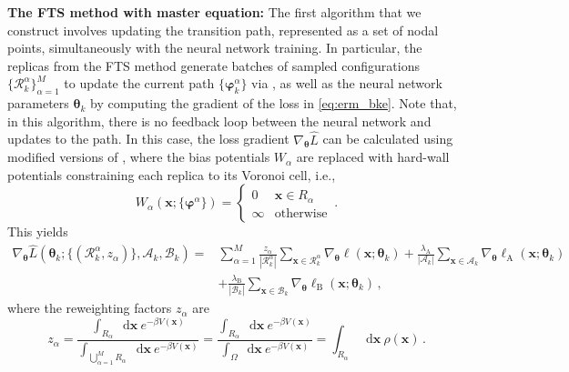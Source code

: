 \documentclass{article}
\numberwithin{equation}{section}
\def\*#1{\mathbf{#1}}
\newcommand*\diff{\mathop{}\!\mathrm{d}}
\theoremstyle{definition}
\theoremstyle{remark}
\def\thetab{\boldsymbol{\theta}}
\def\varphib{\boldsymbol{\varphi}}
\begin{document}
\textbf{The FTS method with master equation:} The first algorithm that we construct involves updating the transition path, represented as a set of nodal points, simultaneously with the neural network training. In particular, the replicas from the FTS method generate batches of sampled configurations $\{ \mathcal{R}^\alpha_k \}_{\alpha=1}^M$ to update the current path $\{\varphib^\alpha_k \}$ via , as well as the neural network parameters $\thetab_k$ by computing the gradient of the loss in \cref{eq:erm_bke}. 
Note that, in this algorithm, there is no feedback loop between the neural network and updates to the path.
In this case, the loss gradient $\nabla_{\thetab} \hat{L}$ can be calculated using modified versions of , where the bias potentials $W_\alpha$ are replaced with hard-wall potentials constraining each replica to its Voronoi cell, i.e., 
\begin{equation}
W_\alpha(\* x; \{\varphib^\alpha\}) = \begin{cases}
0 &  \* x \in R_\alpha
\\
\infty & \text{otherwise} 
\end{cases}
\,.
\label{eq:hardwall-fts}
\end{equation}
This yields 
\begin{align}
\nabla_{\thetab} \hat{L}\left(\thetab_k; \{ (\mathcal{R}^\alpha_k, z_\alpha) \}, \mathcal{A}_k, \mathcal{B}_k\right) =&  \sum\limits_{\alpha=1}^M \frac{z_{\alpha} }{|\mathcal{R}^\alpha_k|} \sum_{\* x \in \mathcal{R}^\alpha_k} \nabla_{\thetab} \ell(\* x; \thetab_{k}) +\frac{\lambda_\mathrm{A}}{|\mathcal{A}_k|} \sum\limits_{\* x \in \mathcal{A}_k} \nabla_{\thetab} \ell_\mathrm{A}(\* x; \thetab_{k}) \nonumber
\\
                                                                                                                      &+\frac{\lambda_\mathrm{B}}{|\mathcal{B}_k|} \sum\limits_{\* x \in \mathcal{B}_k}\nabla_{\thetab} \ell_\mathrm{B}(\* x; \thetab_{k}) \,, \label{eq:basefts_grad}
\end{align}
where the reweighting factors $z_\alpha$ are
\begin{equation}
z_\alpha = \frac{ \int_{R_\alpha} \diff \* x \ e^{-\beta V(\* x)}}{\int_{\bigcup_{\alpha=1}^M R_\alpha}  \diff \* x \ e^{-\beta V(\* x)}} = \frac{ \int_{R_\alpha} \diff \* x \ e^{-\beta V(\* x)}}{\int_{\Omega}  \diff \* x \ e^{-\beta V(\* x)}} = \int_{R_\alpha} \diff \* x \ \rho(\* x) \,.  \label{eq:zalphafts}
\end{equation}
\end{document}
